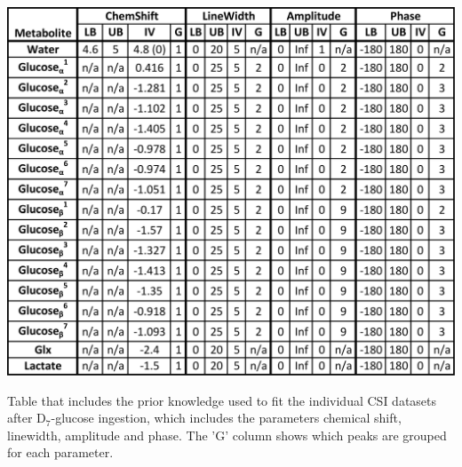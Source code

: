 \documentclass[class=article, crop=false]{standalone}
\begin{document}
\begin{table}[H]
    \centering
    \includegraphics[width = 1\textwidth]{Figures/Glucose/Prior_Table.png}
    \caption{Table that includes the prior knowledge used to fit the individual CSI datasets after D$_7$-glucose ingestion, which includes the parameters chemical shift, linewidth, amplitude and phase. The 'G' column shows which peaks are grouped for each parameter.}
    \label{fig:Glu:Prior}
\end{table}
\end{document}
